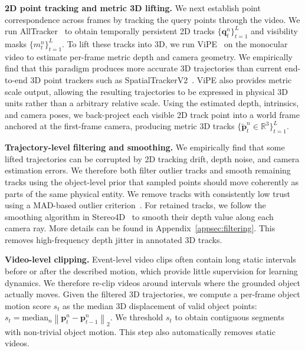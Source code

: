 \documentclass{llmxive}
\begin{document}
\noindent\textbf{2D point tracking and metric 3D lifting.}
We next establish point correspondence across frames by tracking the query points through the video. We run AllTracker~\cite{alltracker} to obtain temporally persistent 2D tracks  $\{\mathbf{q}_{t}^{n}\}_{t=1}^{L}$ and visibility masks $\{m_t^{n}\}_{t=1}^{L}$.
To lift these tracks into 3D, we run ViPE~\cite{vipe} on the monocular video to estimate per-frame metric depth and camera geometry. We empirically find that this paradigm produces more accurate 3D trajectories than current end-to-end 3D point trackers such as SpatialTrackerV2~\cite{spatialtrackerv2}. ViPE also provides metric scale output, allowing the resulting trajectories to be expressed in physical 3D units rather than a arbitrary relative scale.  Using the estimated depth, intrinsics, and camera poses, we back-project each visible 2D track point into a world frame anchored at the first-frame camera, producing metric 3D tracks $\{\tilde{\mathbf{p}}_{t}^{n} \in \mathbb{R}^3\}_{t=1}^{L}$.

\noindent\textbf{Trajectory-level filtering and smoothing.}
We empirically find that some lifted trajectories can be corrupted by 2D tracking drift, depth noise, and camera estimation errors. 
We therefore both filter outlier tracks and smooth remaining tracks using the object-level prior that sampled points should move coherently as parts of the same physical entity.
We remove tracks with consistently low trust using a MAD-based outlier criterion~\cite{leys2013madoutlier}.
For retained tracks, we follow the smoothing algorithm in Stereo4D~\cite{stereo4d} to smooth their depth value along each camera ray. More details can be found in Appendix~\ref{appsec:filtering}.
This removes high-frequency depth jitter in annotated 3D tracks.

\noindent\textbf{Video-level clipping.}
Event-level video clips often contain long static intervals before or after the described motion, which provide little supervision for learning dynamics. We therefore re-clip videos around intervals where the grounded object actually moves.
Given the filtered 3D trajectories, we compute a per-frame object motion score $s_t$ as the median 3D displacement of valid object points:
$
s_t
=
\mathrm{median}_{n}
\left\|
\mathbf{p}_{t}^{n}
-
\mathbf{p}_{t-1}^{n}
\right\|_2 .
$
We threshold $s_t$ to obtain contiguous segments with non-trivial object motion. This step also automatically removes static videos.
\end{document}
